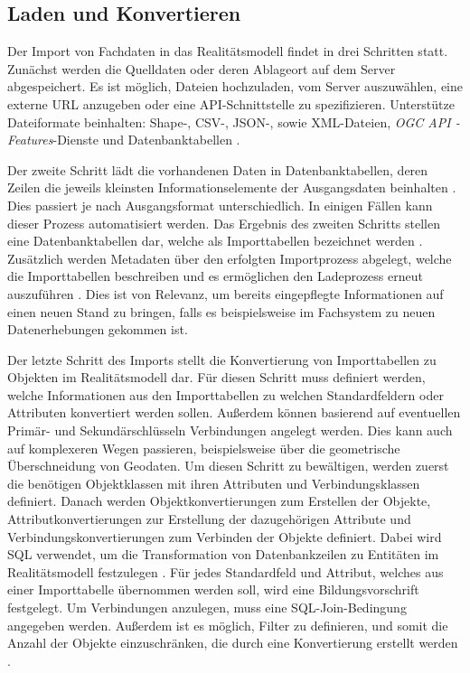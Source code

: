 \subsection{Laden und Konvertieren}
\label{sec:simplex-importer}

Der Import von Fachdaten in das Realitätsmodell findet in drei Schritten statt. Zunächst werden die Quelldaten oder deren Ablageort auf dem Server abgespeichert. Es ist möglich, Dateien hochzuladen, vom Server auszuwählen, eine externe \acs{URL} anzugeben oder eine \acs{API}-Schnittstelle zu spezifizieren. Unterstütze Dateiformate beinhalten: Shape-, \acs{CSV}-, \acs{JSON}-, sowie \acs{XML}-Dateien, \textit{OGC API - Features}-Dienste und Datenbanktabellen \parencite{simplex4datagmbhSimplex4TwIS}.

Der zweite Schritt lädt die vorhandenen Daten in Datenbanktabellen, deren Zeilen die jeweils kleinsten Informationselemente der Ausgangsdaten beinhalten \parencite{grossmannFachsystemeSchemaevolution2024}. Dies passiert je nach Ausgangsformat unterschiedlich. In einigen Fällen kann dieser Prozess automatisiert werden. Das Ergebnis des zweiten Schritts stellen eine Datenbanktabellen dar, welche als Importtabellen bezeichnet werden . Zusätzlich werden Metadaten über den erfolgten Importprozess abgelegt, welche die Importtabellen beschreiben und es ermöglichen den Ladeprozess erneut auszuführen \parencite{grossmannFachsystemeSchemaevolution2024}. Dies ist von Relevanz, um bereits eingepflegte Informationen auf einen neuen Stand zu bringen, falls es beispielsweise im Fachsystem zu neuen Datenerhebungen gekommen ist.

Der letzte Schritt des Imports stellt die Konvertierung von Importtabellen zu Objekten im Realitätsmodell dar. Für diesen Schritt muss definiert werden, welche Informationen aus den Importtabellen zu welchen Standardfeldern oder Attributen konvertiert werden sollen. Außerdem können basierend auf eventuellen Primär- und Sekundärschlüsseln Verbindungen angelegt werden. Dies kann auch auf komplexeren Wegen passieren, beispielsweise über die geometrische Überschneidung von Geodaten. Um diesen Schritt zu bewältigen, werden zuerst die benötigen Objektklassen mit ihren Attributen und Verbindungsklassen definiert. Danach werden Objektkonvertierungen zum Erstellen der Objekte, Attributkonvertierungen zur Erstellung der dazugehörigen Attribute und Verbindungskonvertierungen zum Verbinden der Objekte definiert. Dabei wird \acs{SQL} verwendet, um die Transformation von Datenbankzeilen zu Entitäten im Realitätsmodell festzulegen \parencite{grossmannFachsystemeSchemaevolution2024}. Für jedes Standardfeld und Attribut, welches aus einer Importtabelle übernommen werden soll, wird eine Bildungsvorschrift festgelegt. Um Verbindungen anzulegen, muss eine \acs{SQL}-Join-Bedingung angegeben werden. Außerdem ist es möglich, Filter zu definieren, und somit die Anzahl der Objekte einzuschränken, die durch eine Konvertierung erstellt werden \parencite{grossmannFachsystemeSchemaevolution2024}.
